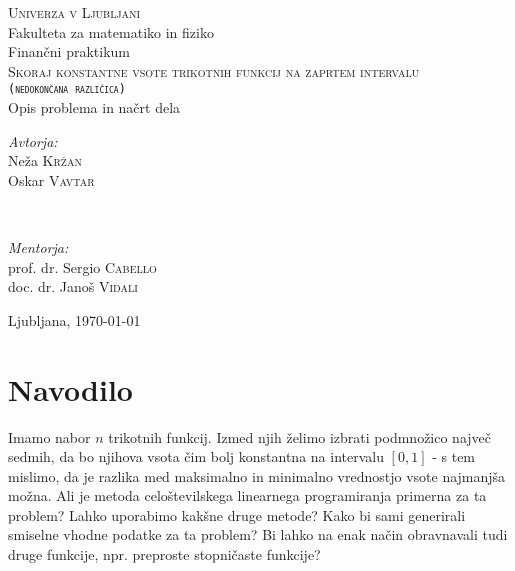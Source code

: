 \documentclass[11pt]{article}
\theoremstyle{definition}
\newcommand{\1}{\mathbbm{1}}
\begin{document}
\begin{titlepage} 

	\center 
	
	\textsc{\LARGE Univerza v Ljubljani}\\[0.5cm] 
	{\Large Fakulteta za matematiko in fiziko}\\[3cm] 
	
	{\large Finančni praktikum}\\[1.0cm]
	
	{\huge \textsc{Skoraj konstantne vsote trikotnih funkcij na zaprtem intervalu \\\texttt{(nedokončana različica)}}}\\[1.0cm]
	
	{\large Opis problema in načrt dela}\\[3.0cm]
	
	\begin{minipage}{0.4\textwidth}
		\begin{flushleft}
			\large
			\textit{Avtorja:}\\
			Neža \textsc{Kržan} \\
			Oskar \textsc{Vavtar} 
		\end{flushleft}
	\end{minipage}
	~
	\begin{minipage}{0.4\textwidth}
		\begin{flushright}
			\large
			\textit{Mentorja:}\\
			prof. dr. Sergio \textsc{Cabello} \\
			doc. dr. Janoš \textsc{Vidali}
		\end{flushright}
	\end{minipage}
	
	\vfill\vfill\vfill 
	
	{\large{Ljubljana, \today}} 
	 
	\vfill 
	
\end{titlepage}

\section{Navodilo}
\vspace{0.5cm}

Imamo nabor $n$ trikotnih funkcij. Izmed njih želimo izbrati podmnožico največ sedmih, da bo njihova vsota čim bolj konstantna na intervalu $[0,1]$ - s tem mislimo, da je razlika med maksimalno in minimalno vrednostjo vsote najmanjša možna. Ali je metoda celoštevilskega linearnega programiranja primerna za ta problem? Lahko uporabimo kakšne druge metode? Kako bi sami generirali smiselne vhodne podatke za ta problem? Bi lahko na enak način obravnavali tudi druge funkcije, npr. preproste stopničaste funkcije?
\vspace{0.5cm}
\end{document}

